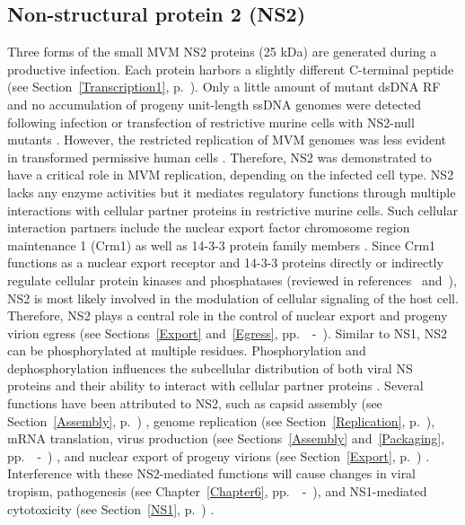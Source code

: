 
\subsection{Non-structural protein 2 (NS2)}
Three forms of the small MVM NS2 proteins (25 kDa) are generated during a productive infection. Each protein harbors a slightly different C-terminal peptide (see Section~\ref{Transcription1}, p.~\pageref{Transcription1}). Only a little amount of mutant dsDNA RF and no accumulation of progeny unit-length ssDNA genomes were detected following infection or transfection of restrictive murine cells with NS2-null mutants \cite{pmid1385828}. However, the restricted replication of MVM genomes was less evident in transformed permissive human cells \cite{pmid2147041}. Therefore, NS2 was demonstrated to have a critical role in MVM replication, depending on the infected cell type. NS2 lacks any enzyme activities but it mediates regulatory functions through multiple interactions with cellular partner proteins in restrictive murine cells. Such cellular interaction partners include the nuclear export factor chromosome region maintenance 1 (Crm1) as well as 14-3-3 protein family members \cite{pmid10438867, pmid10527855, pmid8892871}. Since Crm1 functions as a nuclear export receptor and 14-3-3 proteins directly or indirectly regulate cellular protein kinases and phosphatases (reviewed in references \cite{pmid7709434}~and~\cite{pmid7743183}), NS2 is most likely involved in the modulation of cellular signaling of the host cell. Therefore, NS2 plays a central role in the control of nuclear export and progeny virion egress (see Sections~\ref{Export} and~\ref{Egress}, pp.~\pageref{Export}~-~\pageref{Egress1}). Similar to NS1, NS2 can be phosphorylated at multiple residues. Phosphorylation and dephosphorylation influences the subcellular distribution of both viral NS proteins \cite{pmid2142555} and their ability to interact with cellular partner proteins \cite{pmid10438867}. Several functions have been attributed to NS2, such as capsid assembly (see Section~\ref{Assembly}, p.~\pageref{Assembly}) \cite{pmid9168889}, genome replication (see Section~\ref{Replication}, p.~\pageref{Replication}), mRNA translation, virus production (see Sections~\ref{Assembly} and~\ref{Packaging}, pp.~\pageref{Assembly}~-~\pageref{Packaging1}) \cite{pmid2147041, pmid8419637}, and nuclear export of progeny virions (see Section~\ref{Export}, p.~\pageref{Export}) \cite{pmid11884550, pmid10527855, pmid12239307, pmid10438867}. Interference with these NS2-mediated functions will cause changes in viral tropism, pathogenesis (see Chapter~\ref{Chapter6}, pp.~\pageref{Chapter6}~-~\pageref{Chaper6end}), and NS1-mediated cytotoxicity (see Section~\ref{NS1}, p.~\pageref{NS1}) \cite{pmid2137660, pmid1373202, pmid9519837, pmid16039688, pmid8317090}.                 



